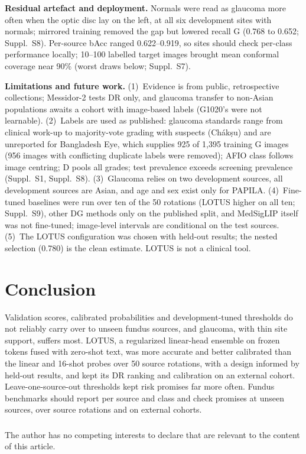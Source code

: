\documentclass[runningheads]{llncs}
\newcommand{\sups}[1]{Suppl.~S#1}
\begin{document}
\textbf{Residual artefact and deployment.} Normals were read as glaucoma more often when the optic disc lay on the left, at all six development sites with normals; mirrored training removed the gap but lowered recall G (0.768 to 0.652; \sups{8}). Per-source bAcc ranged 0.622--0.919, so sites should check per-class performance locally; 10--100 labelled target images brought mean conformal coverage near 90\% (worst draws below; \sups{7}).

\textbf{Limitations and future work.} (1)~Evidence is from public, retrospective collections; Messidor-2 tests DR only, and glaucoma transfer to non-Asian populations awaits a cohort with image-based labels (G1020's were not learnable). (2)~Labels are used as published: glaucoma standards range from clinical work-up to majority-vote grading with suspects (Ch\'ak\d{s}u) and are unreported for Bangladesh Eye, which supplies 925 of 1,395 training G images (956 images with conflicting duplicate labels were removed); AFIO class follows image centring; D pools all grades; test prevalence exceeds screening prevalence (\sups{1}, \sups{8}). (3)~Glaucoma relies on two development sources, all development sources are Asian, and age and sex exist only for PAPILA. (4)~Fine-tuned baselines were run over ten of the 50 rotations (LOTUS higher on all ten; \sups{9}), other DG methods only on the published split, and MedSigLIP itself was not fine-tuned; image-level intervals are conditional on the test sources. (5)~The LOTUS configuration was chosen with held-out results; the nested selection (0.780) is the clean estimate. LOTUS is not a clinical tool.

\section{Conclusion}
Validation scores, calibrated probabilities and development-tuned thresholds do not reliably carry over to unseen fundus sources, and glaucoma, with thin site support, suffers most. LOTUS, a regularized linear-head ensemble on frozen tokens fused with zero-shot text, was more accurate and better calibrated than the linear and 16-shot probes over 50 source rotations, with a design informed by held-out results, and kept its DR ranking and calibration on an external cohort. Leave-one-source-out thresholds kept risk promises far more often. Fundus benchmarks should report per source and class and check promises at unseen sources, over source rotations and on external cohorts.

\begin{credits}
\subsubsection{\discintname} The author has no competing interests to declare that are relevant to the content of this article.
\end{credits}



\end{document}
